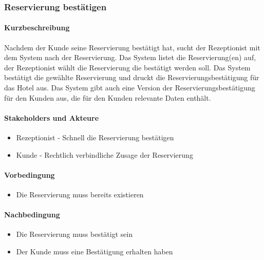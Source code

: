 \subsubsection{Reservierung bestätigen}
\label{UseCase_ReservierungBestätigen}

\paragraph{Kurzbeschreibung}
Nachdem der \Gls{Kunde} seine \Gls{Reservierung} bestätigt hat, sucht der \Gls{Rezeptionist} mit dem System nach der \Gls{Reservierung}. Das System listet die \Gls{Reservierung}(en) auf, der \Gls{Rezeptionist} wählt die \Gls{Reservierung} die bestätigt werden soll. Das System bestätigt die gewählte \Gls{Reservierung} und druckt die Reservierungsbestätigung für das Hotel aus. Das System gibt auch eine Version der Reservierungsbestätigung für den \Gls{Kunde}n aus, die für den \Gls{Kunde}n relevante Daten enthält.

\paragraph{Stakeholders und Akteure}
\begin{itemize}
	\item \Gls{Rezeptionist} - Schnell die \Gls{Reservierung} bestätigen
	\item \Gls{Kunde} - Rechtlich verbindliche Zusage der \Gls{Reservierung}
\end{itemize}

\paragraph{Vorbedingung}
\begin{itemize}
	\item Die \Gls{Reservierung} muss bereits existieren
\end{itemize}

\paragraph{Nachbedingung}
\begin{itemize}
	\item Die \Gls{Reservierung} muss bestätigt sein
	\item Der \Gls{Kunde} muss eine Bestätigung erhalten haben
\end{itemize}

